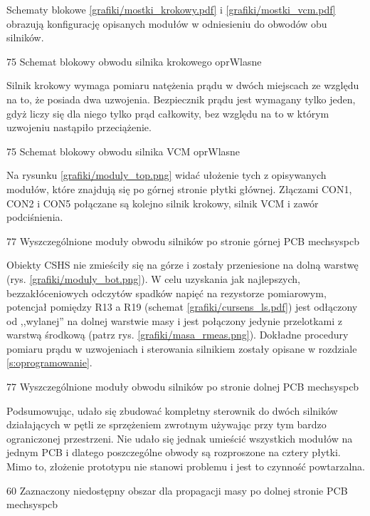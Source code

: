 Schematy blokowe \ref{grafiki/mostki_krokowy.pdf} i \ref{grafiki/mostki_vcm.pdf} obrazują konfigurację opisanych modułów w odniesieniu do obwodów obu silników.

	{75}
	{Schemat blokowy obwodu silnika krokowego}
	{oprWlasne}
	
Silnik krokowy wymaga pomiaru natężenia prądu w dwóch miejscach ze względu na to, że posiada dwa uzwojenia. Bezpiecznik prądu jest wymagany tylko jeden, gdyż liczy się dla niego tylko prąd całkowity, bez względu na to w którym uzwojeniu nastąpiło przeciążenie. 

	{75}
	{Schemat blokowy obwodu silnika VCM}
	{oprWlasne}

Na rysunku \ref{grafiki/moduly_top.png} widać ułożenie tych z opisywanych modułów, które znajdują się po górnej stronie płytki głównej. Złączami CON1, CON2 i CON5 połączane są kolejno silnik krokowy, silnik VCM i zawór podciśnienia.
	
	{77}
	{Wyszczególnione moduły obwodu silników po stronie górnej PCB}
	{mechsyspcb}
	
Obiekty CSHS nie zmieściły się na górze i zostały przeniesione na dolną warstwę (rys. \ref{grafiki/moduly_bot.png}). W celu uzyskania jak najlepszych, bezzakłóceniowych odczytów spadków napięć na rezystorze pomiarowym, potencjał pomiędzy R13 a R19 (schemat \ref{grafiki/cursens_ls.pdf}) jest odłączony od ,,wylanej'' na dolnej warstwie masy i jest połączony jedynie przelotkami z warstwą środkową (patrz rys. \ref{grafiki/masa_rmeas.png}). Dokładne procedury pomiaru prądu w uzwojeniach i sterowania silnikiem zostały opisane w rozdziale \ref{s:oprogramowanie}. 

	{77}
	{Wyszczególnione moduły obwodu silników po stronie dolnej PCB}
	{mechsyspcb}

Podsumowując, udało się zbudować kompletny sterownik do dwóch silników działających w pętli ze sprzężeniem zwrotnym używając przy tym bardzo ograniczonej przestrzeni. Nie udało się jednak umieścić wszystkich modułów na jednym PCB i dlatego poszczególne obwody są rozproszone na cztery płytki. Mimo to, złożenie prototypu nie stanowi problemu i jest to czynność powtarzalna.

	{60}
	{Zaznaczony niedostępny obszar dla propagacji masy po dolnej stronie PCB}
	{mechsyspcb}


\clearpage














